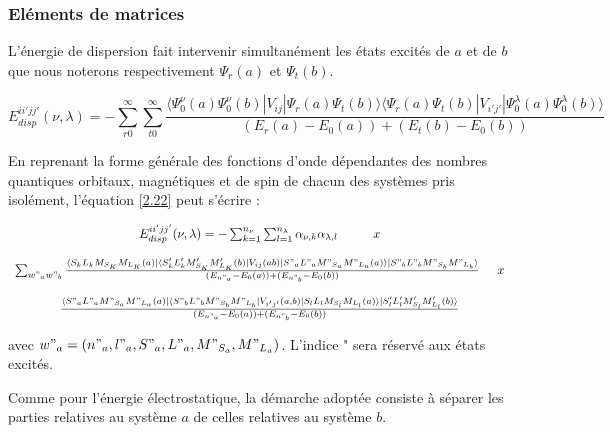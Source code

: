 \subsubsection{Eléments de matrices}

L'énergie de dispersion fait intervenir simultanément les états excités de $a$ et de $b$ que nous noterons respectivement $\Psi_{r}(a)$ et $\Psi_{t}(b)$.

\begin{equation}
E_{disp}^{ii'jj'} (\nu , \lambda) = - \sum_{r0}^{\infty} \sum_{t0}^{\infty} \frac{\langle \Psi_{0}^{\nu} (a) \Psi_{0}^{\nu} (b)| V_{ij}|\Psi_{r} (a) \Psi_{t} (b) \rangle  \langle \Psi_{r} (a) \Psi_{t} (b) |V_{i'j'}| \Psi_{0}^{\lambda} (a) \Psi_{0}^{\lambda}(b) \rangle}{(E_{r} (a) - E_{0} (a)) + (E_{t} (b) - E_{0} (b))} \label{2.22}
\end{equation}


En reprenant la forme générale des fonctions d'onde dépendantes des nombres quantiques orbitaux, magnétiques et de spin de chacun des systèmes pris isolément, l'équation \ref{2.22} peut s'écrire : 

\begin{equation}
\begin{array}{c}
E_{disp}^{ii'jj'} (\nu , \lambda) = - \sum_{k=1}^{n_{\nu}} \sum_{l=1}^{n_{\lambda}} \alpha_{\nu , k} \alpha_{\lambda , l} \hspace{1cm} x \\
\\
\sum_{w"_{a} w"_{b}} \frac{\langle S_{k} L_{k} M_{S_{K}} M_{L_{K}} (a) |\langle S'_{k} L'_{k} M'_{S_{K}} M'_{L_{K}} (b)| V_{ij} (ab) | S"_{a} L"_{a} M"_{S_{a}} M"_{L_{a}} (a)\rangle| S"_{b} L"_{b} M"_{S_{b}} M"_{L_{b}} \rangle}{(E_{n"_{a}} - E_{0}(a)) + (E_{n"_{b}} - E_{0}(b))} \hspace{0.5 cm} x \\
\\
\frac{\langle S"_{a} L"_{a} M"_{S_{a}} M"_{L_{a}} (a)| \langle S"_{b} L"_{b} M"_{S_{b}} M"_{L_{b}} | V_{i'j'}(a,b)| S_{l} L_{l} M_{S_{l}} M_{L_{l}} (a) \rangle | S'_{l} L'_{l} M'_{S_{l}} M'_{L_{l}} (b) \rangle}{(E_{n"_{a}} - E_{0} (a)) + (E_{n"_{b}} - E_{0}(b))}
\end{array}
\end{equation}

avec $w"_{a} = (n"_{a}, l"_{a}, S"_{a}, L"_{a}, M"_{S_{a}}, M"_{L_{a}})$. L'indice " sera réservé aux états excités. 

Comme pour l'énergie électrostatique, la démarche adoptée consiste à séparer les parties relatives au système $a$ de celles relatives au système $b$. \\

